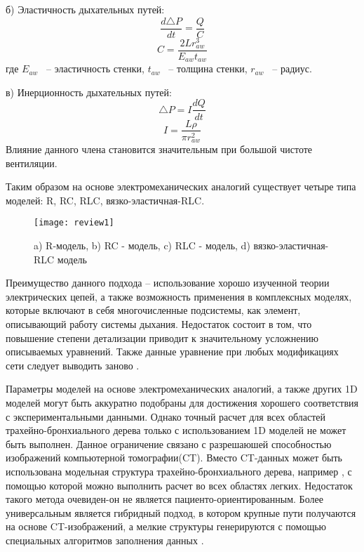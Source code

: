 б) Эластичность дыхательных путей:
\begin{equation}
\frac{d\triangle P}{dt}=\frac{Q}{C}
\end{equation}
\begin{equation}
C=\frac{2Lr_{aw}^{3}}{E_{aw}t_{aw}}
\end{equation}
где $E_{aw}$ ~-- эластичность стенки, $t_{aw}$ ~-- толщина стенки, $r_{aw}$ ~-- радиус.

в) Инерционность дыхательных путей:
\begin{equation}
\triangle P=I\frac{dQ}{dt}
\end{equation}
\begin{equation}
I=\frac{L\rho}{\pi r_{aw}^{2}}
\end{equation}
Влияние данного члена становится значительным при большой чистоте вентиляции.

Таким образом на основе электромеханических аналогий существует четыре типа моделей: R, RC, RLC, вязко-эластичная-RLC.
\begin{figure}[!ht]
	\centering
	\texttt{[image: review1]}
	\caption{a) R-модель, b) RC - модель, c) RLC - модель, d) вязко-эластичная-RLC модель } 
\end{figure}
Преимущество данного подхода – использование хорошо изученной теории электрических цепей, а также возможность применения в комплексных моделях, которые включают в себя многочисленные подсистемы, как элемент, описывающий работу системы дыхания.   Недостаток состоит в том, что повышение степени детализации приводит к значительному усложнению описываемых уравнений. Также данные уравнение при любых модификациях сети следует выводить заново \cite{Bates2009}.    

Параметры моделей на основе электромеханических аналогий, а также других 1D моделей \cite{Suki1993, Lutchen1996,Gillis1999,Nucci2002} могут быть аккуратно подобраны для достижения хорошего соответствия с экспериментальными данными. Однако точный расчет для всех областей трахейно-бронхиального дерева только с использованием 1D моделей не может быть выполнен. Данное ограничение связано с разрешаюшей способностью изображений компьютерной томографии(CT). Вместо CT-данных может быть использована модельная структура трахейно-бронхиального дерева, например \cite{Horsfield1971,Weibel1963}, с помощью которой можно выполнить расчет во всех областях легких. Недостаток такого метода очевиден-он не является пациенто-ориентированным. Более универсальным является гибридный подход, в котором крупные пути получаются на основе CT-изображений, а мелкие структуры генерируются с помощью специальных алгоритмов заполнения данных \cite{Tawhai2000,Tawhai2010,Tawhai2006,Lin2009}. 

